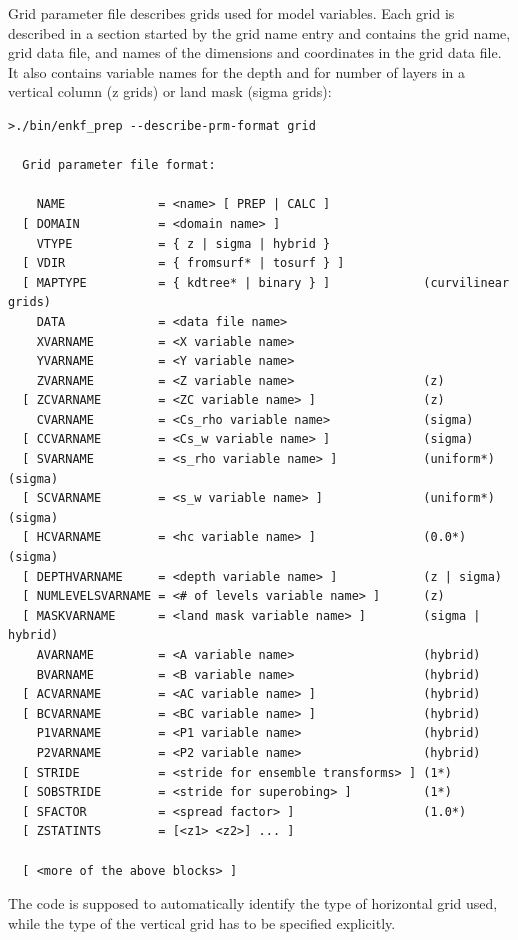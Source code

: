 \documentclass[11pt]{report}
\begin{document}
Grid parameter file describes grids used for model variables.
Each grid is described in a section started by the grid name entry and contains the grid name, grid data file, and names of the dimensions and coordinates in the grid data file.
It also contains variable names for the depth and for number of layers in a vertical column (z grids) or land mask (sigma grids):
\begin{Verbatim}[frame=single,fontsize=\footnotesize]
>./bin/enkf_prep --describe-prm-format grid

  Grid parameter file format:

    NAME             = <name> [ PREP | CALC ]
  [ DOMAIN           = <domain name> ]
    VTYPE            = { z | sigma | hybrid }
  [ VDIR             = { fromsurf* | tosurf } ]
  [ MAPTYPE          = { kdtree* | binary } ]             (curvilinear grids)
    DATA             = <data file name>
    XVARNAME         = <X variable name>
    YVARNAME         = <Y variable name>
    ZVARNAME         = <Z variable name>                  (z)
  [ ZCVARNAME        = <ZC variable name> ]               (z)
    CVARNAME         = <Cs_rho variable name>             (sigma)
  [ CCVARNAME        = <Cs_w variable name> ]             (sigma)
  [ SVARNAME         = <s_rho variable name> ]            (uniform*) (sigma)
  [ SCVARNAME        = <s_w variable name> ]              (uniform*) (sigma)
  [ HCVARNAME        = <hc variable name> ]               (0.0*) (sigma)
  [ DEPTHVARNAME     = <depth variable name> ]            (z | sigma)
  [ NUMLEVELSVARNAME = <# of levels variable name> ]      (z)
  [ MASKVARNAME      = <land mask variable name> ]        (sigma | hybrid)
    AVARNAME         = <A variable name>                  (hybrid)
    BVARNAME         = <B variable name>                  (hybrid)
  [ ACVARNAME        = <AC variable name> ]               (hybrid)
  [ BCVARNAME        = <BC variable name> ]               (hybrid)
    P1VARNAME        = <P1 variable name>                 (hybrid)
    P2VARNAME        = <P2 variable name>                 (hybrid)
  [ STRIDE           = <stride for ensemble transforms> ] (1*)
  [ SOBSTRIDE        = <stride for superobing> ]          (1*)
  [ SFACTOR          = <spread factor> ]                  (1.0*)
  [ ZSTATINTS        = [<z1> <z2>] ... ]

  [ <more of the above blocks> ]
\end{Verbatim}

The code is supposed to automatically identify the type of horizontal grid used, while the type of the vertical grid has to be specified explicitly.
\end{document}
